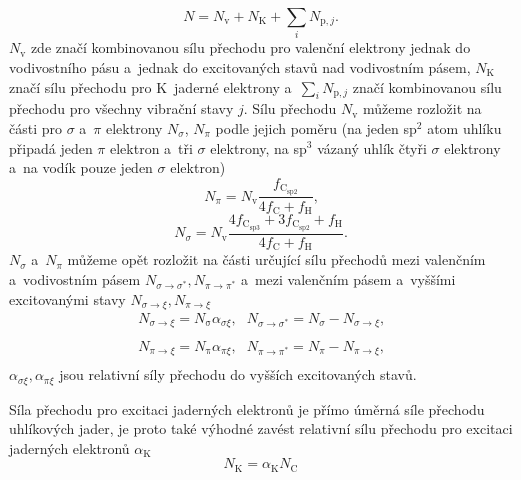 \begin{equation}
N = N_\mathrm{v} + N_\mathrm{K} + \sum_i N_{\mathrm{p},j} \text{.}
\end{equation}
%
$N_\mathrm{v}$ zde značí kombinovanou sílu přechodu pro valenční elektrony jednak do vodivostního pásu a~jednak do excitovaných stavů nad vodivostním pásem, $N_\mathrm{K}$ značí sílu přechodu pro K~jaderné elektrony a~$\sum_i N_{\mathrm{p},j}$ značí kombinovanou sílu přechodu pro všechny vibrační stavy $j$. Sílu přechodu $N_\mathrm{v}$ můžeme rozložit na části pro $\sigma$ a~$\pi$ elektrony $N_\sigma$, $N_\pi$ podle jejich poměru (na jeden sp$^2$ atom uhlíku připadá jeden $\pi$ elektron a~tři $\sigma$ elektrony, na sp$^3$ vázaný uhlík čtyři $\sigma$ elektrony a~na vodík pouze jeden $\sigma$  elektron)
\begin{equation}
N_\pi = N_\mathrm{v} \frac{f_\mathrm{C_{sp2}}}{4f_\mathrm{C} + f_\mathrm{H}}  \text{,}
\end{equation}
\begin{equation}
N_\sigma = N_\mathrm{v} \frac{4f_\mathrm{C_{sp3}} + 3f_\mathrm{C_{sp2}} + f_\mathrm{H}}{4f_\mathrm{C} + f_\mathrm{H}}  \text{.}
\end{equation}
%
$N_\sigma$ a~$N_\pi$ můžeme opět rozložit na části určující sílu přechodů mezi valenčním a~vodivostním pásem $N_{\sigma \rightarrow \sigma^*}, N_{\pi \rightarrow \pi^*}$ a~mezi valenčním pásem a~vyššími excitovanými stavy $N_{\sigma \rightarrow \xi}, N_{\pi \rightarrow \xi}$
\begin{equation}
\begin{array}{lr}
N_{\sigma \rightarrow \xi} = N_\mathrm{\sigma} \alpha_{\sigma\xi} \text{,} &
N_{\sigma \rightarrow \sigma^*} = N_\sigma - N_{\sigma \rightarrow \xi} \text{,} \\
\end{array}
\end{equation}
\begin{equation}
\begin{array}{lr}
N_{\pi \rightarrow \xi} = N_\mathrm{\pi} \alpha_{\pi\xi} \text{,} &
N_{\pi \rightarrow \pi^*} = N_\pi - N_{\pi \rightarrow \xi} \text{,} \\
\end{array}
\end{equation}
$\alpha_{\sigma\xi}, \alpha_{\pi\xi}$ jsou relativní síly přechodu do vyšších excitovaných stavů.


Síla přechodu pro excitaci jaderných elektronů je přímo úměrná síle přechodu uhlíkových jader, je proto také výhodné zavést relativní sílu přechodu pro excitaci jaderných elektronů $\alpha_\mathrm{K}$
\begin{equation}
N_\mathrm{K} =  \alpha_\mathrm{K} N_\mathrm{C}
\end{equation}


